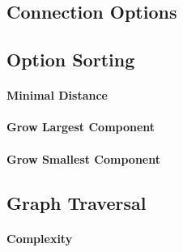\subsection{Connection Options}



\subsection{Option Sorting}


\paragraph{Minimal Distance}

\paragraph{Grow Largest Component}

\paragraph{Grow Smallest Component}



\subsection{Graph Traversal}


\paragraph{Complexity}

